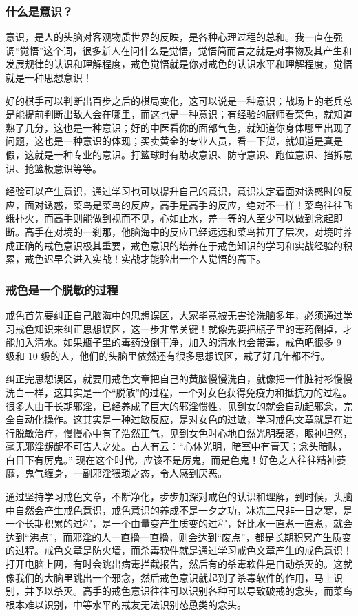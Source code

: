\documentclass{ctexart}
\begin{document}
\subsubsection{什么是意识？}

意识，是人的头脑对客观物质世界的反映，是各种心理过程的总和。我一直在强调“觉悟”这个词，很多新人在问什么是觉悟，觉悟简而言之就是对事物及其产生和发展规律的认识和理解程度，戒色觉悟就是你对戒色的认识水平和理解程度，觉悟就是一种思想意识！

好的棋手可以判断出百步之后的棋局变化，这可以说是一种意识；战场上的老兵总是能提前判断出敌人会在哪里，而这也是一种意识；有经验的厨师看菜色，就知道熟了几分，这也是一种意识；好的中医看你的面部气色，就知道你身体哪里出现了问题，这也是一种意识的体现；买卖黄金的专业人员，看一下货，就知道是真是假，这就是一种专业的意识。打篮球时有助攻意识、防守意识、跑位意识、挡拆意识、抢篮板意识等等。

经验可以产生意识，通过学习也可以提升自己的意识，意识决定着面对诱惑时的反应，面对诱惑，菜鸟是菜鸟的反应，高手是高手的反应，绝对不一样！菜鸟往往飞蛾扑火，而高手则能做到视而不见，心如止水，差一等的人至少可以做到念起即断。高手在对境的一刹那，他脑海中的反应已经远远和菜鸟拉开了层次，对境时养成正确的戒色意识极其重要，戒色意识的培养在于戒色知识的学习和实战经验的积累，戒色迟早会进入实战！实战才能验出一个人觉悟的高下。

\subsubsection{戒色是一个脱敏的过程}

戒色首先要纠正自己脑海中的思想误区，大家毕竟被无害论洗脑多年，必须通过学习戒色知识来纠正思想误区，这一步非常关键！就像先要把瓶子里的毒药倒掉，才能加入清水。如果瓶子里的毒药没倒干净，加入的清水也会带毒，戒色吧很多 9 级和 10 级的人，他们的头脑里依然还有很多思想误区，戒了好几年都不行。

纠正完思想误区，就要用戒色文章把自己的黄脑慢慢洗白，就像把一件脏衬衫慢慢洗白一样，这其实是一个“脱敏”的过程，一个对女色获得免疫力和抵抗力的过程。很多人由于长期邪淫，已经养成了巨大的邪淫惯性，见到女的就会自动起邪念，完全自动化操作。这其实是一种过敏反应，是对女色的过敏，学习戒色文章就是在进行脱敏治疗，慢慢心中有了浩然正气，见到女色时心地自然光明磊落，眼神坦然，毫无邪淫龌龊不可告人之处。古人有云：“心体光明，暗室中有青天；念头暗昧，白日下有厉鬼。” 现在这个时代，应该不是厉鬼，而是色鬼！好色之人往往精神萎靡，鬼气缠身，一副邪淫猥琐之态，令人感到厌恶。

通过坚持学习戒色文章，不断净化，步步加深对戒色的认识和理解，到时候，头脑中自然会产生戒色意识，戒色意识的养成不是一夕之功，冰冻三尺非一日之寒，是一个长期积累的过程，是一个由量变产生质变的过程，好比水一直煮一直煮，就会达到“沸点”，而邪淫的人一直撸一直撸，则会达到“废点”，都是长期积累产生质变的过程。戒色文章是防火墙，而杀毒软件就是通过学习戒色文章产生的戒色意识！打开电脑上网，有时会跳出病毒拦截报告，然后有的杀毒软件是自动杀灭的。这就像我们的大脑里跳出一个邪念，然后戒色意识就起到了杀毒软件的作用，马上识别，并予以杀灭。高手的戒色意识往往可以识别各种可以导致破戒的念头，而菜鸟根本难以识别，中等水平的戒友无法识别怂恿类的念头。
\end{document}
